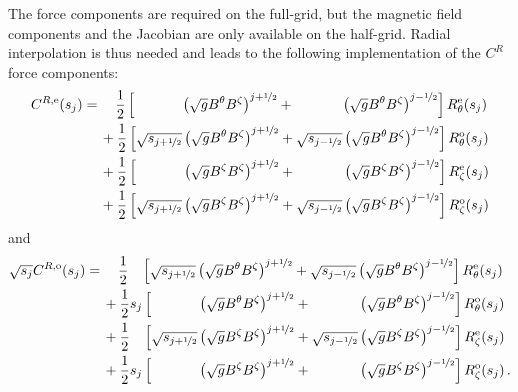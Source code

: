The force components are required on the full-grid, but the magnetic field components and the Jacobian are only available on the half-grid.
Radial interpolation is thus needed and leads to the following implementation of the $C^R$ force components:
\begin{align}
  C^{R,\mathrm{e}} (s_j)
  =&\, \phantom{+}~ \frac{1}{2} \left[   \phantom{\sqrt{s_{j+\half}}} \left( \sqrt{g} B^\theta  B^\zeta \right)^{j+\half}
                                       + \phantom{\sqrt{s_{j-\half}}} \left( \sqrt{g} B^\theta  B^\zeta \right)^{j-\half} \right] R_\theta^\mathrm{e}(s_j) \nonumber \\
  ~&\,          +   \frac{1}{2} \left[            \sqrt{s_{j+\half}}  \left( \sqrt{g} B^\theta  B^\zeta \right)^{j+\half}
                                       +          \sqrt{s_{j-\half}}  \left( \sqrt{g} B^\theta  B^\zeta \right)^{j-\half} \right] R_\theta^\mathrm{o}(s_j) \nonumber \\
  ~&\,          +   \frac{1}{2} \left[   \phantom{\sqrt{s_{j+\half}}} \left( \sqrt{g}  B^\zeta  B^\zeta \right)^{j+\half}
                                       + \phantom{\sqrt{s_{j-\half}}} \left( \sqrt{g}  B^\zeta  B^\zeta \right)^{j-\half} \right]  R_\zeta^\mathrm{e}(s_j) \nonumber \\
  ~&\,          +   \frac{1}{2} \left[            \sqrt{s_{j+\half}}  \left( \sqrt{g}  B^\zeta  B^\zeta \right)^{j+\half}
                                       +          \sqrt{s_{j-\half}}  \left( \sqrt{g}  B^\zeta  B^\zeta \right)^{j-\half} \right]  R_\zeta^\mathrm{o}(s_j) \label{eqn:crmn_e}
\end{align}
and
\begin{align}
  \sqrt{s_j} C^{R,\mathrm{o}} (s_j)
  =&\, \phantom{+}~ \frac{1}{2} \phantom{s_j} \left[            \sqrt{s_{j+\half}}  \left( \sqrt{g} B^\theta  B^\zeta \right)^{j+\half}
                                                     +          \sqrt{s_{j-\half}}  \left( \sqrt{g} B^\theta  B^\zeta \right)^{j-\half} \right] R_\theta^\mathrm{e}(s_j) \nonumber \\
  ~&\,          +   \frac{1}{2}          s_j  \left[   \phantom{\sqrt{s_{j+\half}}} \left( \sqrt{g} B^\theta  B^\zeta \right)^{j+\half}
                                                     + \phantom{\sqrt{s_{j-\half}}} \left( \sqrt{g} B^\theta  B^\zeta \right)^{j-\half} \right] R_\theta^\mathrm{o}(s_j) \nonumber \\
  ~&\,          +   \frac{1}{2} \phantom{s_j} \left[            \sqrt{s_{j+\half}}  \left( \sqrt{g}  B^\zeta  B^\zeta \right)^{j+\half}
                                                     +          \sqrt{s_{j-\half}}  \left( \sqrt{g}  B^\zeta  B^\zeta \right)^{j-\half} \right]  R_\zeta^\mathrm{e}(s_j) \nonumber \\
  ~&\,          +   \frac{1}{2}          s_j  \left[   \phantom{\sqrt{s_{j+\half}}} \left( \sqrt{g}  B^\zeta  B^\zeta \right)^{j+\half}
                                                     + \phantom{\sqrt{s_{j-\half}}} \left( \sqrt{g}  B^\zeta  B^\zeta \right)^{j-\half} \right]  R_\zeta^\mathrm{o}(s_j) \label{eqn:crmn_o} \, .
\end{align}

